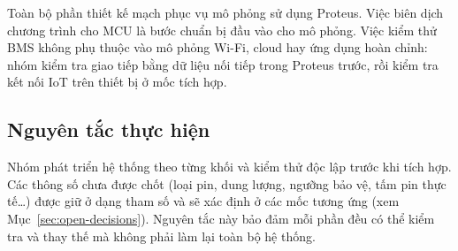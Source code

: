 Toàn bộ phần thiết kế mạch phục vụ mô phỏng sử dụng Proteus. Việc biên dịch chương trình cho MCU là bước chuẩn bị đầu vào cho mô phỏng. Việc kiểm thử BMS không phụ thuộc vào mô phỏng Wi-Fi, cloud hay ứng dụng hoàn chỉnh: nhóm kiểm tra giao tiếp bằng dữ liệu nối tiếp trong Proteus trước, rồi kiểm tra kết nối IoT trên thiết bị ở mốc tích hợp.

\subsection{Nguyên tắc thực hiện}

Nhóm phát triển hệ thống theo từng khối và kiểm thử độc lập trước khi tích hợp. Các thông số chưa được chốt (loại pin, dung lượng, ngưỡng bảo vệ, tấm pin thực tế\dots) được giữ ở dạng tham số và sẽ xác định ở các mốc tương ứng (xem Mục~\ref{sec:open-decisions}). Nguyên tắc này bảo đảm mỗi phần đều có thể kiểm tra và thay thế mà không phải làm lại toàn bộ hệ thống.
